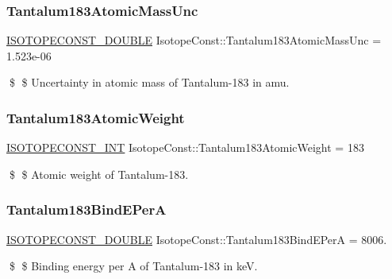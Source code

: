 \subsubsection{\texorpdfstring{Tantalum183\+Atomic\+Mass\+Unc}{Tantalum183AtomicMassUnc}}
{\footnotesize\ttfamily \mbox{\hyperlink{group___isotope_const-_macros_ga8f45a7272ce02c0b4c65c44636ed719a}{I\+S\+O\+T\+O\+P\+E\+C\+O\+N\+S\+T\+\_\+\+D\+O\+U\+B\+LE}} Isotope\+Const\+::\+Tantalum183\+Atomic\+Mass\+Unc = 1.\+523e-\/06}

\$ \$ Uncertainty in atomic mass of Tantalum-\/183 in amu. \mbox{\label{group___isotope_const-_tantalum-_ta183_ga504254223459fe2f657dfc96d4694d39}} 
\subsubsection{\texorpdfstring{Tantalum183\+Atomic\+Weight}{Tantalum183AtomicWeight}}
{\footnotesize\ttfamily \mbox{\hyperlink{group___isotope_const-_macros_ga5f18360b3e99483a35c32d789e62621c}{I\+S\+O\+T\+O\+P\+E\+C\+O\+N\+S\+T\+\_\+\+I\+NT}} Isotope\+Const\+::\+Tantalum183\+Atomic\+Weight = 183}

\$ \$ Atomic weight of Tantalum-\/183. \mbox{\label{group___isotope_const-_tantalum-_ta183_ga821cc001dca6d79c78b818ac01255745}} 
\subsubsection{\texorpdfstring{Tantalum183\+Bind\+E\+PerA}{Tantalum183BindEPerA}}
{\footnotesize\ttfamily \mbox{\hyperlink{group___isotope_const-_macros_ga8f45a7272ce02c0b4c65c44636ed719a}{I\+S\+O\+T\+O\+P\+E\+C\+O\+N\+S\+T\+\_\+\+D\+O\+U\+B\+LE}} Isotope\+Const\+::\+Tantalum183\+Bind\+E\+PerA = 8006.}

\$ \$ Binding energy per A of Tantalum-\/183 in keV. \mbox{\label{group___isotope_const-_tantalum-_ta183_gafd7822c358b3f2ac1d2f7ae3435270f8}} 
